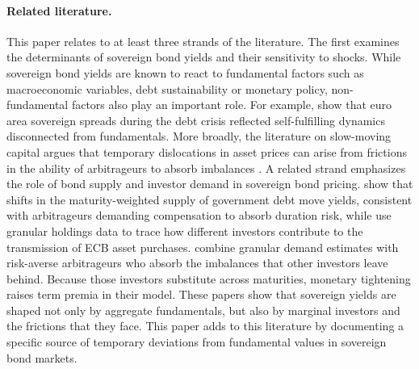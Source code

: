 \documentclass[english, 11pt, oneside]{article}
\begin{document}
\paragraph{Related literature.} This paper relates to at least three strands of the literature. The first examines the determinants of sovereign bond yields and their sensitivity to shocks. While sovereign bond yields are known to react to fundamental factors such as macroeconomic variables, debt sustainability or monetary policy, non-fundamental factors also play an important role. For example, \citet{degauwe2013} show that euro area sovereign spreads during the debt crisis reflected self-fulfilling dynamics disconnected from fundamentals. More broadly, the literature on slow-moving capital argues that temporary dislocations in asset prices can arise from frictions in the ability of arbitrageurs to absorb imbalances \citep{duffie2010, mitchell2007}. A related strand emphasizes the role of bond supply and investor demand in sovereign bond pricing. \citet{greenwood2014} show that shifts in the maturity-weighted supply of government debt move yields, consistent with arbitrageurs demanding compensation to absorb duration risk, while \citet{koijen2021} use granular holdings data to trace how different investors contribute to the transmission of ECB asset purchases. \citet{jansen2024} combine granular demand estimates with risk-averse arbitrageurs who absorb the imbalances that other investors leave behind. Because those investors substitute across maturities, monetary tightening raises term premia in their model. These papers show that sovereign yields are shaped not only by aggregate fundamentals, but also by marginal investors and the frictions that they face. This paper adds to this literature by documenting a specific source of temporary deviations from fundamental values in sovereign bond markets.
\end{document}
